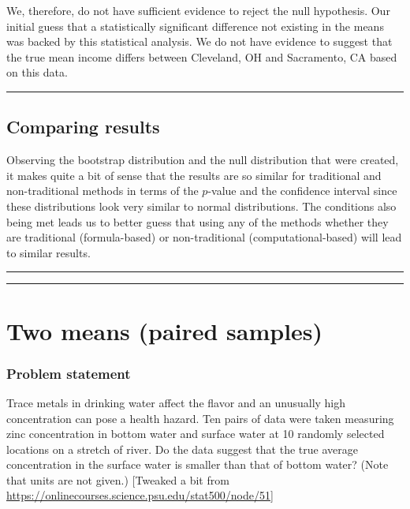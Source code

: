 \documentclass[12pt,]{krantz}
\begin{document}
We, therefore, do not have sufficient evidence to reject the null
hypothesis. Our initial guess that a statistically significant
difference not existing in the means was backed by this statistical
analysis. We do not have evidence to suggest that the true mean income
differs between Cleveland, OH and Sacramento, CA based on this data.

\begin{center}\rule{0.5\linewidth}{\linethickness}\end{center}

\subsection{Comparing results}\label{comparing-results-3}

Observing the bootstrap distribution and the null distribution that were
created, it makes quite a bit of sense that the results are so similar
for traditional and non-traditional methods in terms of the \(p\)-value
and the confidence interval since these distributions look very similar
to normal distributions. The conditions also being met leads us to
better guess that using any of the methods whether they are traditional
(formula-based) or non-traditional (computational-based) will lead to
similar results.

\begin{center}\rule{0.5\linewidth}{\linethickness}\end{center}

\begin{center}\rule{0.5\linewidth}{\linethickness}\end{center}

\section{Two means (paired samples)}\label{two-means-paired-samples}

\subsubsection*{Problem statement}\label{problem-statement-4}


Trace metals in drinking water affect the flavor and an unusually high
concentration can pose a health hazard. Ten pairs of data were taken
measuring zinc concentration in bottom water and surface water at 10
randomly selected locations on a stretch of river. Do the data suggest
that the true average concentration in the surface water is smaller than
that of bottom water? (Note that units are not given.) {[}Tweaked a bit
from \url{https://onlinecourses.science.psu.edu/stat500/node/51}{]}
\end{document}
